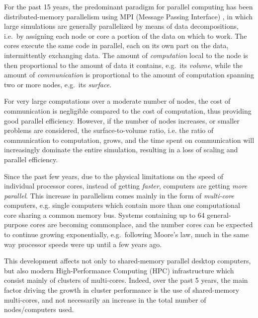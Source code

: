 \documentclass[final]{siamltex}
\begin{document}
For the past 15 years, the predominant paradigm for parallel
computing has been distributed-memory parallelism using MPI
(Message Passing Interface) \cite{ref:Snir1998},
in which large simulations are generally
parallelized by means of data decompositions, i.e.~by assigning
each node or core a portion of the data on which to work.
The cores execute the same code
in parallel, each on its own part on the data, intermittently exchanging data.
The amount of {\em computation} local to the node is then proportional
to the amount of data it contains, e.g.~its {\em volume}, while
the amount of {\em communication} is proportional to the
amount of computation spanning two or more nodes, e.g.~its
{\em surface}.

For very large computations over a moderate number of nodes,
the cost of communication is negligible compared to the
cost of computation, thus providing good parallel efficiency.
However, if the number of nodes increases, or 
smaller problems are considered, the surface-to-volume ratio,
i.e. the ratio of communication to computation,
grows, and the time spent on communication will increasingly
dominate the entire simulation, resulting in a loss of scaling
and parallel efficiency.


Since the past few years, due to the physical limitations
on the speed of individual processor cores, instead of
getting {\em faster}, computers are getting {\em more parallel}.
This increase in parallelism comes mainly in the form of
{\em multi-core} computers, e.g. single computers which
contain more than one computational core sharing a common 
memory bus.
Systems containing up to 64 general-purpose cores are becoming
commonplace, and the number cores can be expected to continue
growing exponentially, e.g.~following Moore's law, much in the
same way processor speeds were up until a few years ago.

This development affects not only to shared-memory parallel desktop
computers, but also modern High-Performance Computing (HPC)
infrastructure which consist mainly of clusters of multi-cores.
Indeed, over the past 5 years, the main factor driving the growth
in cluster performance is the use of shared-memory multi-cores,
and not necessarily an increase in the total number of
nodes/computers used.
\end{document}
